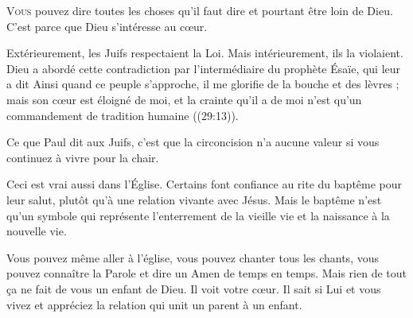 



\lettrine{V}{ous} pouvez dire toutes les choses qu'il faut dire
 et pourtant être loin de Dieu. C'est parce que Dieu s'intéresse au c\oe{}ur.

Extérieurement, les Juifs respectaient la Loi.
 Mais intérieurement, ils la violaient.
 Dieu a abordé cette contradiction par l'intermédiaire
 du prophète Ésaïe, qui leur a dit\frcolon{} 
 \Og Ainsi quand ce peuple s'approche, il me glorifie de la bouche
 et des lèvres ; mais son c\oe{}ur est éloigné de moi, et la crainte
 qu'il a de moi n'est qu'un commandement de tradition humaine \Fg{}
 ((29:13)). 


Ce que Paul dit aux Juifs, c'est que la circoncision n'a aucune valeur
 si vous continuez à vivre pour la chair.

Ceci est vrai aussi dans l'Église. 
 Certains font confiance au rite du baptême pour leur salut,
 plutôt qu'à une relation vivante avec Jésus.
 Mais le baptême n'est qu'un symbole qui représente l'enterrement
 de la vieille vie et la naissance à la nouvelle vie.

Vous pouvez même aller à l'église, vous pouvez chanter tous les chants,
 vous pouvez connaître la Parole et dire un \Og Amen \Fg{} de temps en temps.
 Mais rien de tout \c{c}a ne fait de vous un enfant de Dieu.
 Il voit votre c\oe{}ur. Il sait si Lui et vous vivez et appréciez
 la relation qui unit un parent à un enfant.

\dvrule



